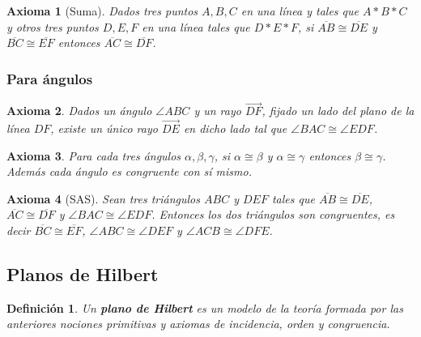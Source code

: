 \documentclass[12pt, spanish]{article}
\newtheorem*{defin}{Definición}
\theoremstyle{axstyle}
\newtheorem{ax}{Axioma}
\theoremstyle{axbstyle}
\begin{document}
\begin{ax}[Suma]\label{C3}
  Dados tres puntos $A, B, C$ en una línea y tales que $A * B * C$ y otros tres
  puntos $D, E, F$ en una línea tales que $D * E * F$, si
  $\overline{AB}\cong\overline{DE}$ y $\overline{BC}\cong\overline{EF}$ entonces
  $\overline{AC}\cong\overline{DF}$.
\end{ax}



\subsubsection{Para ángulos}

\begin{ax}\label{C4}
  Dados un ángulo $\angle ABC$ y un rayo $\overrightarrow{DF}$, fijado un lado
  del plano de la línea $DF$, existe un único rayo $\overrightarrow{DE}$ en
  dicho lado tal que $\angle BAC\cong\angle EDF$.

\end{ax}

\begin{ax}\label{C5}
  Para cada tres ángulos $\alpha, \beta, \gamma$, si $\alpha\cong\beta$ y
  $\alpha\cong\gamma$ entonces $\beta\cong\gamma$. Además cada ángulo es
  congruente con sí mismo.
\end{ax}

\begin{ax}[SAS]\label{C6}
  Sean tres triángulos $ABC$ y $DEF$ tales que
  $\overline{AB}\cong\overline{DE}$, $\overline{AC}\cong\overline{DF}$ y $\angle
  BAC\cong\angle EDF$. Entonces los dos triángulos son congruentes, es decir
  $\overline{BC}\cong\overline{EF}$, $\angle ABC\cong\angle DEF$ y $\angle
  ACB\cong\angle DFE$.
\end{ax}

\subsection{Planos de Hilbert}

\begin{defin}
    Un \textbf{plano de Hilbert} es un modelo de la teoría formada por las
    anteriores nociones primitivas y axiomas de incidencia, orden y congruencia.
\end{defin}
\end{document}
